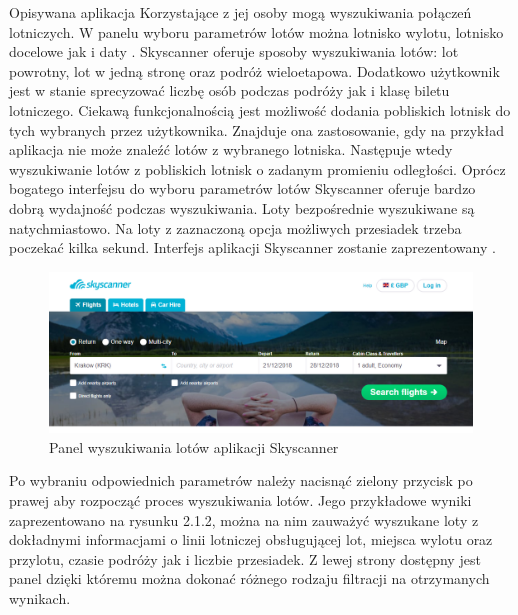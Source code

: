 \documentclass[12pt, twoside]{report}
\begin{document}
Opisywana aplikacja  Korzystające z jej osoby mogą  wyszukiwania połączeń lotniczych. W panelu wyboru parametrów lotów można  lotnisko wylotu, lotnisko docelowe jak i daty . Skyscanner oferuje  sposoby wyszukiwania lotów: lot powrotny, lot w jedną stronę oraz podróż wieloetapowa. Dodatkowo użytkownik jest w stanie sprecyzować liczbę osób podczas podróży jak i klasę biletu lotniczego. Ciekawą funkcjonalnością jest możliwość dodania pobliskich lotnisk do tych wybranych przez użytkownika. Znajduje ona zastosowanie, gdy na przykład aplikacja nie może znaleźć lotów z wybranego lotniska. Następuje wtedy wyszukiwanie lotów z pobliskich lotnisk o zadanym promieniu odległości.
Oprócz bogatego interfejsu do wyboru parametrów lotów Skyscanner oferuje bardzo dobrą wydajność podczas wyszukiwania. Loty bezpośrednie wyszukiwane są natychmiastowo. Na loty z zaznaczoną opcja możliwych przesiadek trzeba poczekać kilka sekund. Interfejs aplikacji Skyscanner zostanie zaprezentowany .
\begin{figure}[!ht]
\centering
\includegraphics[scale=0.50, keepaspectratio]{skyscanner_main.png}
\caption{Panel wyszukiwania lotów aplikacji Skyscanner}
\label{fig:skyscanner_main}
\end{figure}
Po wybraniu odpowiednich parametrów należy nacisnąć zielony przycisk po prawej aby rozpocząć 
proces wyszukiwania lotów. Jego przykładowe wyniki zaprezentowano na rysunku 2.1.2, można na nim zauważyć wyszukane loty z dokładnymi informacjami o linii lotniczej obsługującej lot, miejsca wylotu oraz przylotu, czasie podróży jak i liczbie przesiadek. Z lewej strony dostępny jest panel dzięki któremu można dokonać różnego rodzaju filtracji na otrzymanych wynikach.
\end{document}
